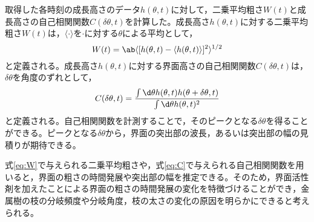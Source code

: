 \documentclass[autodetect-engine,dvi=dvipdfmx,a4paper,ja=standard,oneside,openany,11pt]{bxjsbook}
\begin{document}
取得した各時刻の成長高さのデータ$h(\theta,t)$に対して，二乗平均粗さ$W(t)$と成長高さの自己相関関数$C(\delta\theta,t)$を計算した。成長高さ$h(\theta,t)$に対する二乗平均粗さ$W(t)$は，$\langle\cdot\rangle$を$\cdot$に対する$\theta$による平均として，
\begin{equation}
  W(t) = \ab\langle[h(\theta,t)-\langle h(\theta,t)\rangle]^2\rangle^{1/2}
  \label{eq:W}
\end{equation}
と定義される。成長高さ$h(\theta,t)$に対する界面高さの自己相関関数$C(\delta\theta,t)$は，$\delta \theta$を角度のずれとして，
\begin{equation}
  C(\delta\theta,t) = \frac{\int \d \theta h(\theta,t)h(\theta+\delta\theta,t)}{\int \d \theta h(\theta,t)^2}
  \label{eq:C}
\end{equation}
と定義される。自己相関関数を計測することで，そのピークとなる$\delta \theta$を得ることができる。ピークとなる$\delta \theta$から，界面の突出部の波長，あるいは突出部の幅の見積りが期待できる。

式\eqref{eq:W}で与えられる二乗平均粗さや，式\eqref{eq:C}で与えられる自己相関関数を用いると，界面の粗さの時間発展や突出部の幅を推定できる。そのため，界面活性剤を加えたことによる界面の粗さの時間発展の変化を特徴づけることができ，金属樹の枝の分岐頻度や分岐角度，枝の太さの変化の原因を明らかにできると考えられる。
\ifdraft{
  
  
}{}
\end{document}
